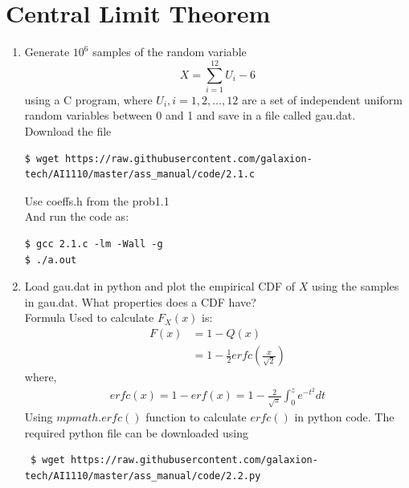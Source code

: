 \documentclass[journal,12pt,twocolumn]{IEEEtran}
\renewcommand\thesection{\arabic{section}}
\begin{document}
\section{Central Limit Theorem}
\begin{enumerate}[label=\thesection.\arabic*.,ref=\thesection.\theenumi]


\item Generate $10^6$ samples of the random variable
    \begin{equation}
        X=\sum_{i=1}^{12} U_i-6        
    \end{equation}
    using a C program, where $U_i, i = 1, 2,\ldots, 12$ are a set of independent uniform random variables between 0 and 1 and save in a file called gau.dat.\\
    
    
    \solution Download the file

    \begin{lstlisting}    
$ wget https://raw.githubusercontent.com/galaxion-tech/AI1110/master/ass_manual/code/2.1.c
    \end{lstlisting}

    Use coeffs.h from the prob1.1\\
    And run the code as:

    \begin{lstlisting}
$ gcc 2.1.c -lm -Wall -g
$ ./a.out
\end{lstlisting}

\item Load gau.dat in python and plot the empirical CDF of $X$ using the samples in gau.dat. What properties does a CDF have?\\

\solution
    Formula Used to calculate $F_X(x)$ is:
    \begin{align}
        F(x)&=1-Q(x)\\
            &=1-\frac{1}{2}erfc(\frac{x}{\sqrt{2}}) 
    \end{align}
    where,
    \begin{align}
        erfc(x)=1-erf(x) = 1-\frac{2}{\sqrt{\pi}}\int_0^z e^{-t^2}dt
    \end{align}
    Using $mpmath.erfc()$ function to calculate $erfc()$ in python code.
    The required python file can be downloaded using

    \begin{lstlisting}
 $ wget https://raw.githubusercontent.com/galaxion-tech/AI1110/master/ass_manual/code/2.2.py
\end{lstlisting}


\end{enumerate}
\end{document}
